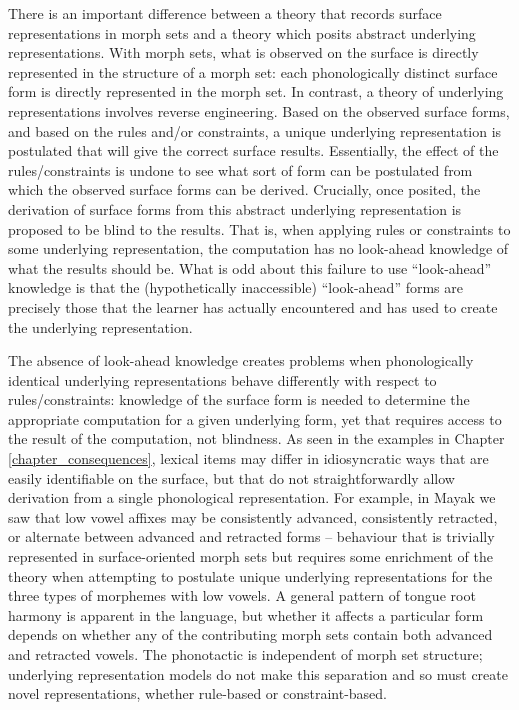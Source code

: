 There is an important difference between a theory that records surface representations in morph sets and a theory which posits abstract underlying representations. With morph sets, what is observed on the surface is directly represented in the structure of a morph set: each phonologically distinct surface form is directly represented in the morph set. In contrast, a theory of underlying representations involves reverse engineering. Based on the observed surface forms, and based on the rules and/or constraints, a unique underlying representation is postulated that will give the correct surface results. Essentially, the effect of the rules/constraints is undone to see what sort of form can be postulated from which the observed surface forms can be derived. Crucially, once posited, the derivation of surface forms from this abstract underlying representation is proposed to be blind to the results. That is, when applying rules or constraints to some underlying representation, the computation has no look-ahead knowledge of what the results should be. What is odd about this failure to use ``look-ahead'' knowledge is that the (hypothetically inaccessible) ``look-ahead'' forms are precisely those that the learner has actually encountered and has used to create the underlying representation.

The absence of look-ahead knowledge creates problems when phonologically identical underlying representations behave differently with respect to rules\slash constraints:  knowledge of the surface form is needed to determine the appropriate computation for a given underlying form, yet that requires access to the result of the computation, not blindness. As seen in the examples in Chapter \ref{chapter_consequences}, lexical items may differ in idiosyncratic ways that are easily identifiable on the surface, but that do not straightforwardly allow derivation from a single phonological representation. For example, in Mayak we saw that low vowel affixes may be consistently advanced, consistently retracted, or alternate between advanced and retracted forms -- behaviour that is trivially represented in surface-oriented morph sets but requires some enrichment of the theory when attempting to postulate unique underlying representations for the three types of morphemes with low vowels. A general pattern of tongue root harmony is apparent in the language, but whether it affects a particular form depends on whether any of the contributing morph sets contain both advanced and retracted vowels. The phonotactic is independent of morph set structure;  underlying representation models do not make this separation and so must create novel representations, whether rule-based or constraint-based.\largerpage


